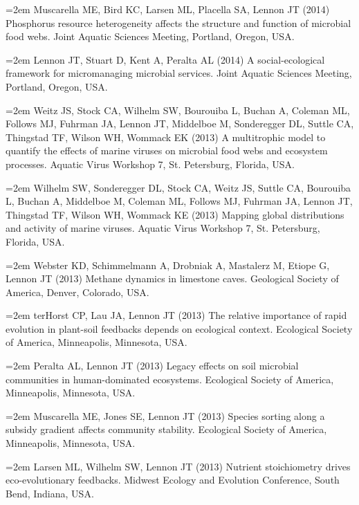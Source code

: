 \documentclass[11pt]{article}
\begin{document}
{\hangindent=2em Muscarella ME, Bird KC, Larsen ML, Placella SA, Lennon JT (2014) Phosphorus resource heterogeneity affects the structure and function of microbial food webs. Joint Aquatic Sciences Meeting, Portland, Oregon, USA. \par

\hangindent=2em Lennon JT, Stuart D, Kent A, Peralta AL (2014) A social-ecological framework for micromanaging microbial services. Joint Aquatic Sciences Meeting, Portland, Oregon, USA. \par

\hangindent=2em Weitz JS, Stock CA, Wilhelm SW, Bourouiba L, Buchan A, Coleman ML, Follows MJ, Fuhrman JA, Lennon JT, Middelboe M, Sonderegger DL, Suttle CA, Thingstad TF, Wilson WH, Wommack EK (2013) A multitrophic model to quantify the effects of marine viruses on microbial food webs and ecosystem processes. Aquatic Virus Workshop 7, St. Petersburg, Florida, USA. \par

\hangindent=2em Wilhelm SW, Sonderegger DL, Stock CA, Weitz JS, Suttle CA, Bourouiba L, Buchan A, Middelboe M, Coleman ML, Follows MJ, Fuhrman JA, Lennon JT, Thingstad TF, Wilson WH, Wommack KE (2013) Mapping global distributions and activity of marine viruses. Aquatic Virus Workshop 7, St. Petersburg, Florida, USA. \par

\hangindent=2em Webster KD, Schimmelmann A, Drobniak A, Mastalerz M, Etiope G, Lennon JT (2013) Methane dynamics in limestone caves. Geological Society of America, Denver, Colorado, USA. \par

\hangindent=2em terHorst CP, Lau JA, Lennon JT (2013) The relative importance of rapid evolution in plant-soil feedbacks depends on ecological context. Ecological Society of America, Minneapolis, Minnesota, USA. \par

\hangindent=2em Peralta AL, Lennon JT (2013) Legacy effects on soil microbial communities in human-dominated ecosystems. Ecological Society of America, Minneapolis, Minnesota, USA. \par

\hangindent=2em Muscarella ME, Jones SE, Lennon JT (2013) Species sorting along a subsidy gradient affects community stability. Ecological Society of America, Minneapolis, Minnesota, USA. \par

\hangindent=2em Larsen ML, Wilhelm SW, Lennon JT (2013) Nutrient stoichiometry drives eco-evolutionary feedbacks. Midwest Ecology and Evolution Conference, South Bend, Indiana, USA. \par

}
\end{document}
